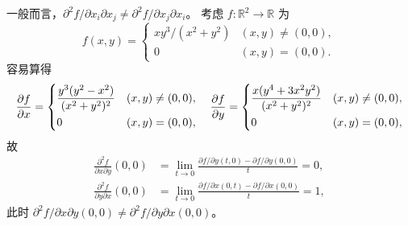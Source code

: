 \documentclass[fontset=none,zihao=-4]{Notes}
\begin{document}
\begin{example}
  一般而言，$\partial^2f/\partial x_i\partial x_j\neq \partial^2f/\partial x_j\partial x_i$。
  考虑 $f:\mathbb{R}^2\to\mathbb{R}$ 为
  \[
    f(x,y)=\begin{cases}
      xy^3/(x^2+y^2) & (x,y)\neq (0,0),\\
      0 & (x,y)=(0,0).
    \end{cases}  
  \]
  容易算得
  \[
    \frac{\partial f}{\partial x}=\begin{dcases}
      \frac{y^3(y^2-x^2)}{(x^2+y^2)^2} & (x,y)\neq (0,0),\\
      0 & (x,y)=(0,0),
    \end{dcases}  \quad 
    \frac{\partial f}{\partial y}=\begin{dcases}
      \frac{x(y^4+3x^2y^2)}{(x^2+y^2)^2} & (x,y)\neq (0,0),\\
      0 & (x,y)=(0,0),
    \end{dcases}  
  \]
  故
  \begin{align*}
    \frac{\partial^2 f}{\partial x\partial y}(0,0)&=
    \lim_{t\to 0}\frac{\partial f/\partial y(t,0)-\partial f/\partial y(0,0)}{t}=0,\\
    \frac{\partial^2 f}{\partial y\partial x}(0,0)&=
    \lim_{t\to 0}\frac{\partial f/\partial x(0,t)-\partial f/\partial x(0,0)}{t}=1,
  \end{align*}
  此时 $\partial^2 f/\partial x\mathord{\partial} y(0,0)\neq \partial^2 f/\partial y\mathord{\partial} x(0,0)$。
\end{example}
\end{document}
